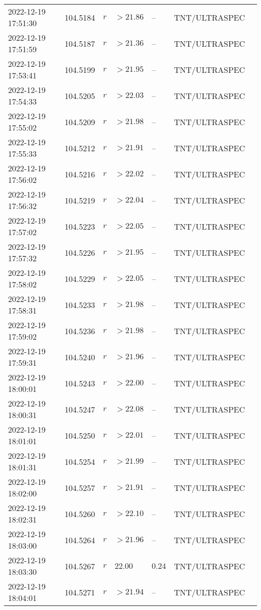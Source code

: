 \documentclass{nature_plusfigure}
\begin{document}
\begin{supplement}
\begin{center}
\begin{longtable}{lllllll}
2022-12-19 17:51:30 & 104.5184 & $r$ & $>21.86$ & -- & TNT/ULTRASPEC &  \\ 
2022-12-19 17:51:59 & 104.5187 & $r$ & $>21.36$ & -- & TNT/ULTRASPEC &  \\ 
2022-12-19 17:53:41 & 104.5199 & $r$ & $>21.95$ & -- & TNT/ULTRASPEC &  \\ 
2022-12-19 17:54:33 & 104.5205 & $r$ & $>22.03$ & -- & TNT/ULTRASPEC &  \\ 
2022-12-19 17:55:02 & 104.5209 & $r$ & $>21.98$ & -- & TNT/ULTRASPEC &  \\ 
2022-12-19 17:55:33 & 104.5212 & $r$ & $>21.91$ & -- & TNT/ULTRASPEC &  \\ 
2022-12-19 17:56:02 & 104.5216 & $r$ & $>22.02$ & -- & TNT/ULTRASPEC &  \\ 
2022-12-19 17:56:32 & 104.5219 & $r$ & $>22.04$ & -- & TNT/ULTRASPEC &  \\ 
2022-12-19 17:57:02 & 104.5223 & $r$ & $>22.05$ & -- & TNT/ULTRASPEC &  \\ 
2022-12-19 17:57:32 & 104.5226 & $r$ & $>21.95$ & -- & TNT/ULTRASPEC &  \\ 
2022-12-19 17:58:02 & 104.5229 & $r$ & $>22.05$ & -- & TNT/ULTRASPEC &  \\ 
2022-12-19 17:58:31 & 104.5233 & $r$ & $>21.98$ & -- & TNT/ULTRASPEC &  \\ 
2022-12-19 17:59:02 & 104.5236 & $r$ & $>21.98$ & -- & TNT/ULTRASPEC &  \\ 
2022-12-19 17:59:31 & 104.5240 & $r$ & $>21.96$ & -- & TNT/ULTRASPEC &  \\ 
2022-12-19 18:00:01 & 104.5243 & $r$ & $>22.00$ & -- & TNT/ULTRASPEC &  \\ 
2022-12-19 18:00:31 & 104.5247 & $r$ & $>22.08$ & -- & TNT/ULTRASPEC &  \\ 
2022-12-19 18:01:01 & 104.5250 & $r$ & $>22.01$ & -- & TNT/ULTRASPEC &  \\ 
2022-12-19 18:01:31 & 104.5254 & $r$ & $>21.99$ & -- & TNT/ULTRASPEC &  \\ 
2022-12-19 18:02:00 & 104.5257 & $r$ & $>21.91$ & -- & TNT/ULTRASPEC &  \\ 
2022-12-19 18:02:31 & 104.5260 & $r$ & $>22.10$ & -- & TNT/ULTRASPEC &  \\ 
2022-12-19 18:03:00 & 104.5264 & $r$ & $>21.96$ & -- & TNT/ULTRASPEC &  \\ 
2022-12-19 18:03:30 & 104.5267 & $r$ & $22.00$ & $0.24$ & TNT/ULTRASPEC &  \\ 
2022-12-19 18:04:01 & 104.5271 & $r$ & $>21.94$ & -- & TNT/ULTRASPEC &  \\ 

\end{longtable}
\end{center}
\end{supplement}
\end{document}
